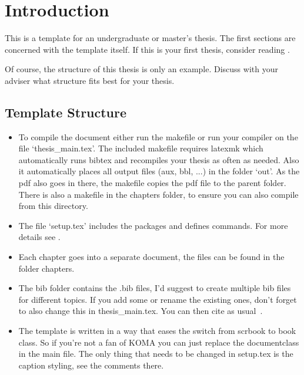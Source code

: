 \chapter{Introduction}\label{chap:introduction}
This is a template for an undergraduate or master's thesis.
The first sections are concerned with the template itself. If this is your first
thesis, consider reading .

Of course, the structure of this
thesis is only an example.
Discuss with your adviser what structure fits best for your thesis.

\section{Template Structure}
\begin{itemize}
    \item To compile the document either run the makefile or run your compiler on the file `thesis\_main.tex'. The included makefile requires latexmk which automatically runs bibtex and recompiles your thesis as often as needed. Also it automatically places all output files (aux, bbl, ...) in the folder `out'. As the pdf also goes in there, the makefile copies the pdf file to the parent folder. There is also a makefile in the chapters folder, to ensure you can also compile from this directory.

    \item The file `setup.tex' includes the packages and defines commands. For more details see .

    \item Each chapter goes into a separate document, the files can be found in the folder chapters.

    \item The bib folder contains the .bib files, I'd suggest to create multiple bib files for different topics. If you add some or rename the existing ones, don't forget to also change this in thesis\_main.tex. You can then cite as usual~\cite{kingma2014adam, bromley1993siamesesignature,muja2009flann}.

    \item The template is written in a way that eases the switch from scrbook to book class. So if you're not a fan of KOMA you can just replace the documentclass in the main file. The only thing that needs to be changed in setup.tex is the caption styling, see the comments there.
\end{itemize}


